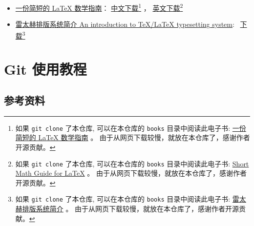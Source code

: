 \documentclass[
    11pt,
    cite=authoryear,
    device=phone,
    lang=cn,
    mode=simple,
    result=answer,
    toc=onecol,
]{elegantbook_sierxue}
\begin{document}
\begin{itemize}
\begin{itemize}
{                    \href{books/lshort.pdf}
                    {The Not So Short Introduction to LaTeX} 。
                    由于从网页下载较慢，就放在本仓库了，感谢作者开源贡献。
                    }
            \item
                \href{https://www.ctan.org/tex-archive/info/lshort/chinese}
                {一份简短的 LaTeX 数学指南}：
                \href{https://wenda.latexstudio.net/article-5006.html}
                {中文下载}\footnote{
                    如果 \lstinline{git clone} 了本仓库,
                    可以在本仓库的 \lstinline{books}
                    目录中阅读此电子书:
                    \href{books/short-math-guide_cn.pdf}
                    {一份简短的 LaTeX 数学指南} 。
                    由于从网页下载较慢，就放在本仓库了，感谢作者开源贡献。
                    }
                ，
                \href{http://mirrors.ustc.edu.cn/CTAN/info/short-math-guide/short-math-guide.pdf}
                {英文下载}\footnote{
                    如果 \lstinline{git clone} 了本仓库,
                    可以在本仓库的 \lstinline{books}
                    目录中阅读此电子书:
                    \href{books/short-math-guide.pdf}
                    {Short Math Guide for \LaTeX{}} 。
                    由于从网页下载较慢，就放在本仓库了，感谢作者开源贡献。
                    }
            \item \href{https://github.com/huangxg/lnotes}
                {雷太赫排版系统简介 An introduction to TeX/LaTeX typesetting system}:~%
                    \href{https://github.com/huangxg/lnotes/raw/master/lnotes2.pdf}
                    {下载}\footnote{
                        如果 \lstinline{git clone} 了本仓库,
                        可以在本仓库的 \lstinline{books}
                        目录中阅读此电子书:
                        \href{books/lnotes2.pdf}{雷太赫排版系统简介} 。
                        由于从网页下载较慢，就放在本仓库了，感谢作者开源贡献。
                        }
        \end{itemize}
\end{itemize}

\chapter{Git 使用教程}%
\label{cha:git-tips}

\section{参考资料}%
\label{sec:git-refs}
\end{document}
